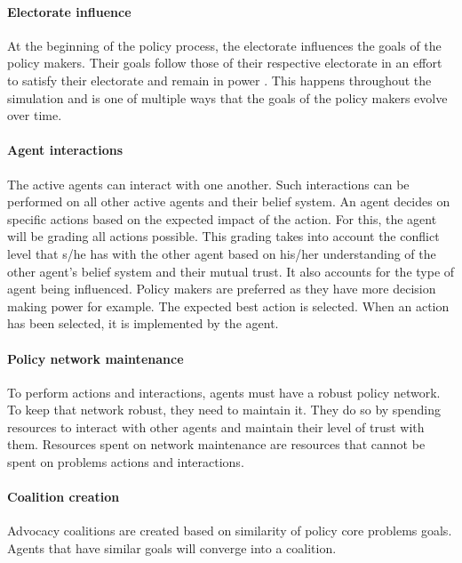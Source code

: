 \paragraph{Electorate influence}

At the beginning of the policy process, the electorate influences the goals of the policy makers. Their goals follow those of their respective electorate in an effort to satisfy their electorate and remain in power \citep{laver2011party}. This happens throughout the simulation and is one of multiple ways that the goals of the policy makers evolve over time.

\paragraph{Agent interactions}

The active agents can interact with one another. Such interactions can be performed on all other active agents and their belief system. An agent decides on specific actions based on the expected impact of the action. For this, the agent will be grading all actions possible. This grading takes into account the conflict level that s/he has with the other agent based on his/her understanding of the other agent's belief system and their mutual trust. It also accounts for the type of agent being influenced. Policy makers are preferred as they have more decision making power for example. The expected best action is selected. When an action has been selected, it is implemented by the agent.

\paragraph{Policy network maintenance}

To perform actions and interactions, agents must have a robust policy network. To keep that network robust, they need to maintain it. They do so by spending resources to interact with other agents and maintain their level of trust with them. Resources spent on network maintenance are resources that cannot be spent on problems actions and interactions.

\paragraph{Coalition creation}

Advocacy coalitions are created based on similarity of policy core problems goals. Agents that have similar goals will converge into a coalition.

